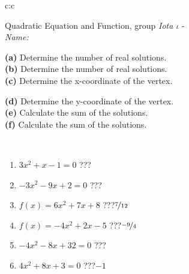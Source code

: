 \documentclass[10pt]{report}
\begin{document}
\begin{tabular}{c:c}
\begin{minipage}[c][104.5mm][t]{0.5\linewidth}
\begin{center}
\vspace{7mm}
{\huge {\LARGE Quadratic Equation and Function}, group \textit{Iota $\iota$} -}\\[5mm]
\textit{Name:}\phantom{xxxxxxxxxxxxxxxxxxxxxxxxxxxxxxxxxxxxxxxxxxxxxxxxxxxxxxxxxxxxxxxxx}\\[5mm]
\begin{minipage}{0.95\linewidth}
\begin{center}
{\small \begin{minipage}{0.5\textwidth}
\textbf{(a)} Determine the number of real solutions. \\[1mm]
\textbf{(b)} Determine the number of real solutions. \\[1mm]
\textbf{(c)} Determine the x-coordinate of the vertex.
\end{minipage} \begin{minipage}{0.49\textwidth}
\textbf{(d)} Determine the y-coordinate of the vertex. \\[1mm]
\textbf{(e)} Calculate the sum of the solutions. \\[1mm]
\textbf{(f)} Calculate the sum of the solutions.
\end{minipage}
}
\end{center}
\end{minipage}
\\[4mm]
\begin{minipage}{0.79\linewidth}
\begin{center}
\begin{varwidth}{\linewidth}
\begin{enumerate}
\Large
\item $3x^2+x-1=0$\quad \dotfill\; ???\;\dotfill {}
\item $-3x^2-9x+2=0$\quad \dotfill\; ???\;\dotfill {}
\item $f(x)=6x^2+7x+8$\quad \dotfill\; ???\;\dotfill \quad $\nicefrac{7}{12}$
\item $f(x)=-4x^2+2x-5$\quad \dotfill\; ???\;\dotfill \quad $\nicefrac{-9}{4}$
\item $-4x^2-8x+32=0$\quad \dotfill\; ???\;\dotfill {}
\item $4x^2+8x+3=0$\quad \dotfill\; ???\;\dotfill \quad $-1$
\end{enumerate}
\end{varwidth}
\end{center}

\end{minipage}
\end{center}
\end{minipage}
\end{tabular}
\end{document}

